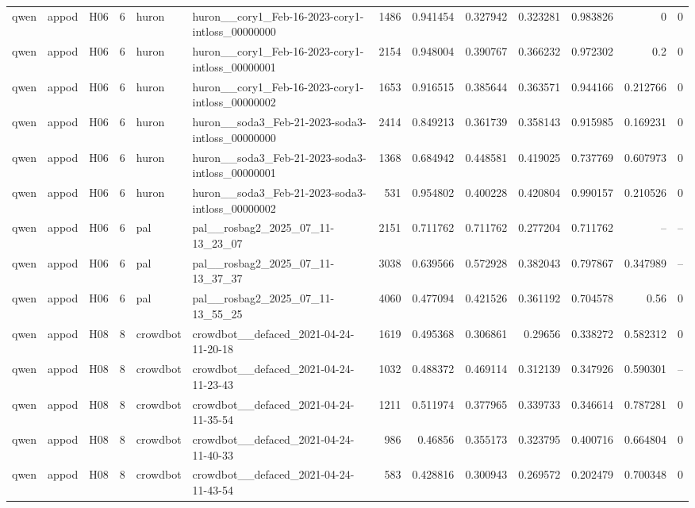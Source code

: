 \begin{longtable}{lllrllrrrrrrr}
qwen & appod & H06 & 6 & huron & huron\_\_cory1\_Feb-16-2023-cory1-intloss\_00000000 & 1486 & 0.941454 & 0.327942 & 0.323281 & 0.983826 & 0 & 0 \\
qwen & appod & H06 & 6 & huron & huron\_\_cory1\_Feb-16-2023-cory1-intloss\_00000001 & 2154 & 0.948004 & 0.390767 & 0.366232 & 0.972302 & 0.2 & 0 \\
qwen & appod & H06 & 6 & huron & huron\_\_cory1\_Feb-16-2023-cory1-intloss\_00000002 & 1653 & 0.916515 & 0.385644 & 0.363571 & 0.944166 & 0.212766 & 0 \\
qwen & appod & H06 & 6 & huron & huron\_\_soda3\_Feb-21-2023-soda3-intloss\_00000000 & 2414 & 0.849213 & 0.361739 & 0.358143 & 0.915985 & 0.169231 & 0 \\
qwen & appod & H06 & 6 & huron & huron\_\_soda3\_Feb-21-2023-soda3-intloss\_00000001 & 1368 & 0.684942 & 0.448581 & 0.419025 & 0.737769 & 0.607973 & 0 \\
qwen & appod & H06 & 6 & huron & huron\_\_soda3\_Feb-21-2023-soda3-intloss\_00000002 & 531 & 0.954802 & 0.400228 & 0.420804 & 0.990157 & 0.210526 & 0 \\
qwen & appod & H06 & 6 & pal & pal\_\_rosbag2\_2025\_07\_11-13\_23\_07 & 2151 & 0.711762 & 0.711762 & 0.277204 & 0.711762 & -- & -- \\
qwen & appod & H06 & 6 & pal & pal\_\_rosbag2\_2025\_07\_11-13\_37\_37 & 3038 & 0.639566 & 0.572928 & 0.382043 & 0.797867 & 0.347989 & -- \\
qwen & appod & H06 & 6 & pal & pal\_\_rosbag2\_2025\_07\_11-13\_55\_25 & 4060 & 0.477094 & 0.421526 & 0.361192 & 0.704578 & 0.56 & 0 \\
qwen & appod & H08 & 8 & crowdbot & crowdbot\_\_defaced\_2021-04-24-11-20-18 & 1619 & 0.495368 & 0.306861 & 0.29656 & 0.338272 & 0.582312 & 0 \\
qwen & appod & H08 & 8 & crowdbot & crowdbot\_\_defaced\_2021-04-24-11-23-43 & 1032 & 0.488372 & 0.469114 & 0.312139 & 0.347926 & 0.590301 & -- \\
qwen & appod & H08 & 8 & crowdbot & crowdbot\_\_defaced\_2021-04-24-11-35-54 & 1211 & 0.511974 & 0.377965 & 0.339733 & 0.346614 & 0.787281 & 0 \\
qwen & appod & H08 & 8 & crowdbot & crowdbot\_\_defaced\_2021-04-24-11-40-33 & 986 & 0.46856 & 0.355173 & 0.323795 & 0.400716 & 0.664804 & 0 \\
qwen & appod & H08 & 8 & crowdbot & crowdbot\_\_defaced\_2021-04-24-11-43-54 & 583 & 0.428816 & 0.300943 & 0.269572 & 0.202479 & 0.700348 & 0 \\

\end{longtable}
